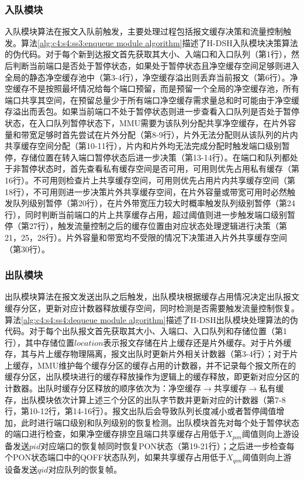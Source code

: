 \subsubsection{入队模块}
入队模块算法在报文入队前触发，主要处理过程包括报文缓存决策和流量控制触发。算法\ref{alg:c4:s4:ss3:enqueue module algorithm}描述了H-DSH入队模块决策算法的伪代码。对于每个新到达报文首先获取其大小、入端口和入口队列（第1行），然后判断当前端口是否处于暂停状态，如果处于暂停状态且净空缓存空间足够则进入全局的静态净空缓存池中（第3-4行），净空缓存溢出则丢弃当前报文（第6行）。净空缓存不是按照最坏情况给每个端口预留，而是预留一个全局的净空缓存池，所有端口共享其空间，在预留总量少于所有端口净空缓存需求量总和时可能由于净空缓存溢出而丢包。如果当前端口不处于暂停状态则进一步查看入口队列是否处于暂停状态，在入口队列暂停状态下，MMU需要为该队列分配共享净空缓存，在片外容量和带宽足够时首先尝试在片外分配（第8-9行），片外无法分配则从该队列的片内共享缓存空间分配（第10-11行），片内和片外均无法完成分配时触发端口级别暂停，存储位置在转入端口暂停状态后进一步决策（第13-14行）。在端口和队列都处于非暂停状态时，首先查看私有缓存空间是否可用，可用则优先占用私有缓存（第16行）。不可用则检查片上共享缓存空间，可用则优先占用片内共享缓存空间（第18行），不可用则进一步决策片外共享缓存空间，在片外容量或带宽可用时必然触发队列级别暂停（第20行），在片外带宽压力较大时概率触发队列级别暂停（第24行），同时判断当前端口的片上共享缓存占用，超过阈值则进一步触发端口级别暂停（第27行），触发流量控制之后的缓存位置由对应状态处理逻辑进行决策（第21，25，28行）。片外容量和带宽均不受限的情况下决策进入片外共享缓存空间（第30行）。

\subsubsection{出队模块}
出队模块算法在报文发送出队之后触发，出队模块根据缓存占用情况决定出队报文缓存分区，更新对应计数器释放缓存空间，同时检测是否需要触发流量控制恢复。算法\ref{alg:c4:s4:ss4:dequeue module algorithm}描述了H-DSH出队模块处理算法的伪代码。对于每个出队报文首先获取其大小、入端口、入口队列和存储位置（第1行），其中存储位置$location$表示报文存储在片上缓存还是片外缓存。对于片外缓存，其与片上缓存物理隔离，报文出队时更新片外相关计数器（第3-4行）；对于片上缓存，MMU维护每个缓存分区的缓存占用的计数器，并不记录每个报文所在的缓存分区，出队模块进行的缓存释放操作为逻辑上的缓存释放，即更新对应分区的计数器。出队时缓存分区释放的顺序依次为：净空缓存$\rightarrow$共享缓存$\rightarrow$私有缓存，出队模块依次计算上述三个分区的出队字节数并更新对应的计数器（第7-8行，第10-12行，第14-16行）。报文出队后会导致队列长度减小或者暂停阈值增加，此时进行端口级别和队列级别的恢复检测。出队模块首先对每个处于暂停状态的端口进行检查，如果净空缓存排空且端口共享缓存占用低于$X_{pon}$阈值则向上游设备发送$pid$对应端口的恢复帧同时恢复PON状态（第19-21行）；之后进一步检查每个PON状态端口中的QOFF状态队列，如果共享缓存占用低于$X_{qon}$阈值则向上游设备发送$qid$对应队列的恢复帧。


